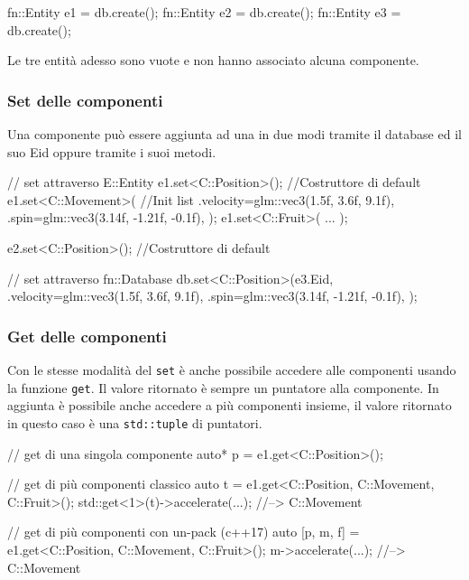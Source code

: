 \begin{cpp}
 fn::Entity e1 = db.create();
 fn::Entity e2 = db.create();
 fn::Entity e3 = db.create();
\end{cpp}

Le tre entità adesso sono vuote e non hanno associato alcuna componente.

\subsubsection{Set delle componenti}
Una componente può essere aggiunta ad una  in due modi tramite il database ed il suo Eid oppure tramite i suoi metodi.
\begin{cpp}[caption={
		Il \texttt{set} può avvenire passando una initialization list, i parametri da inoltrare al costruttore o un oggetto componente.
	}, captionpos=t]
 // set attraverso E::Entity
 e1.set<C::Position>({});   //Costruttore di default
 e1.set<C::Movement>({		//Init list
 	.velocity=glm::vec3(1.5f, 3.6f, 9.1f),
 	.spin=glm::vec3(3.14f, -1.21f, -0.1f),
 });
 e1.set<C::Fruit>({ ... });

 e2.set<C::Position>({}); //Costruttore di default

 // set attraverso fn::Database
 db.set<C::Position>(e3.Eid, {
    .velocity=glm::vec3(1.5f, 3.6f, 9.1f),
    .spin=glm::vec3(3.14f, -1.21f, -0.1f),
 });
\end{cpp}


\subsubsection{Get delle componenti}
Con le stesse modalità del \texttt{set} è anche possibile accedere alle componenti usando la funzione \texttt{get}. Il valore ritornato è sempre un puntatore alla componente. In aggiunta è possibile anche accedere a più componenti insieme, il valore ritornato in questo caso è una \texttt{std::tuple} di puntatori.
\begin{cpp}[caption={
		Utilizzando le funzionalità di un-packing introdotte in c++17 l'utilizzo delle tuple
		risulta molto meno verboso e conveniente. Di fatto l'accesso \enquote{classico} non
		è mai utilizzato.
	}, captionpos=t]
 // get di una singola componente
 auto* p = e1.get<C::Position>();
 
 // get di più componenti classico
 auto t = e1.get<C::Position, C::Movement, C::Fruit>();
 std::get<1>(t)->accelerate(...); //--> C::Movement
 
 // get di più componenti con un-pack (c++17)
 auto [p, m, f] = e1.get<C::Position, C::Movement, C::Fruit>();
 m->accelerate(...); //--> C::Movement
\end{cpp}

